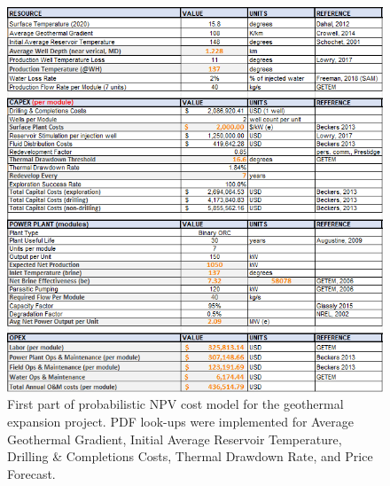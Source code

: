 \begin{figure}[H]
\centering
\includegraphics[width=\textwidth]{templates/images/Figure-Flexible_Model_SheetA.png}
\caption[Probabilistic cost model worksheet (part 1)]{First part of probabilistic NPV cost model for the geothermal expansion project. PDF look-ups were implemented for Average Geothermal Gradient, Initial Average Reservoir Temperature, Drilling \& Completions Costs, Thermal Drawdown Rate, and Price Forecast.}
\label{fig:probabilistic_model_sheet1}
\end{figure}

